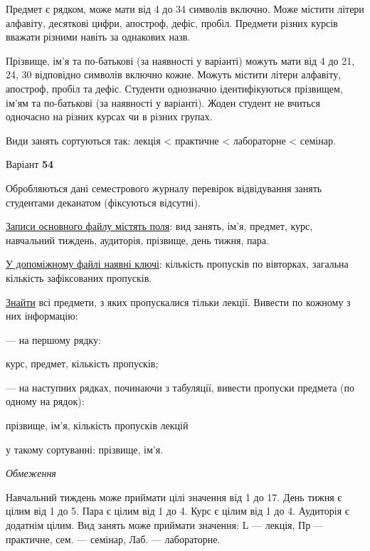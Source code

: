 \documentclass[11pt, ukrainian]{article}
\begin{document}
Предмет є рядком, може мати від 4 до 34 символів включно.
Може містити літери алфавіту, десяткові цифри, апостроф, дефіс, пробіл.
Предмети різних курсів вважати різними навіть за однакових назв.

Прізвище, ім’я та по-батькові (за наявності у варіанті)
можуть мати від 4 до 21, 24, 30 відповідно символів включно кожне.
Можуть містити літери алфавіту, апостроф, пробіл та дефіс.
Студенти однозначно ідентифікуються прізвищем, ім’ям та по-батькові (за наявності у варіанті).
Жоден студент не вчиться одночасно на різних курсах чи в різних групах.

Види занять сортуються так: лекція < практичне < лабораторне < семінар.





\par
\newpage
{\center Варіант  \No \textbf { 54 }\par}
\bigskip
Обробляються дані семестрового журналу перевірок відвідування занять студентами деканатом (фіксуються відсутні). 

\underline{Записи основного файлу містять поля}: вид занять, ім’я, предмет, курс, навчальний тиждень, аудиторія, прізвище, день тижня, пара.

\underline{У допоміжному файлі наявні ключі}: кількість пропусків по вівторках, загальна кількість зафіксованих пропусків.

\underline{Знайти} всі предмети, з яких пропускалися тільки лекції. Вивести по кожному з них інформацію:\par
{\noindent}--- на першому рядку:\par
курс, предмет, кількість пропусків;

{\noindent}--- на наступних рядках, починаючи з табуляції, вивести пропуски предмета (по одному на рядок):\par
прізвище, ім’я, кількість пропусків лекцій

{\noindent}у такому сортуванні: прізвище, ім’я.


\bigskip\textit{Обмеження}

Навчальний тиждень може приймати цілі значення від 1 до 17.
День тижня є цілим від 1 до 5. Пара є цілим від 1 до 4.
Курс є цілим від 1 до 4. Аудиторія є додатнім цілим.
Вид занять може приймати значення:
L --- лекція, Пр --- практичне, сем. --- семінар, Лаб. --- лабораторне.
\end{document}
